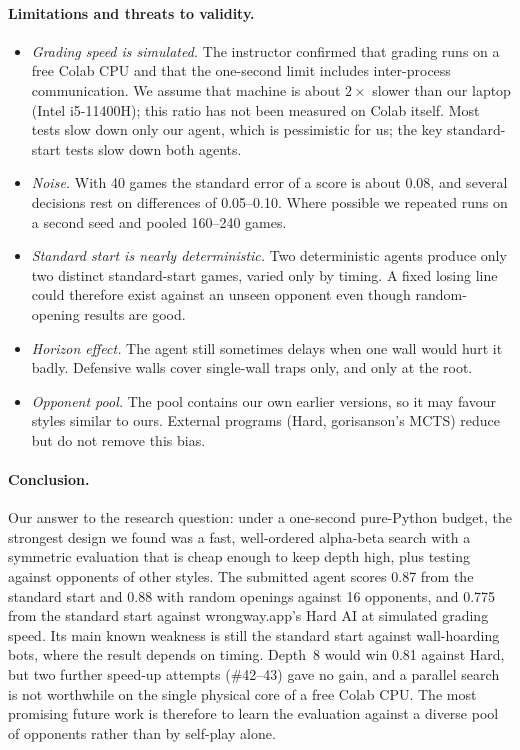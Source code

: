 \paragraph{Limitations and threats to validity.}
\begin{itemize}
  \item \emph{Grading speed is simulated.} The instructor confirmed that grading runs on a free
        Colab CPU and that the one-second limit includes inter-process communication. We assume
        that machine is about $2\times$ slower than our laptop (Intel i5-11400H); this ratio has
        not been measured on Colab itself. Most tests slow down only our agent, which is
        pessimistic for us; the key standard-start tests slow down both agents.
  \item \emph{Noise.} With 40 games the standard error of a score is about 0.08, and several
        decisions rest on differences of 0.05--0.10. Where possible we repeated runs on a second
        seed and pooled 160--240 games.
  \item \emph{Standard start is nearly deterministic.} Two deterministic agents produce only two
        distinct standard-start games, varied only by timing. A fixed losing line could
        therefore exist against an unseen opponent even though random-opening results are good.
  \item \emph{Horizon effect.} The agent still sometimes delays when one wall would hurt it
        badly. Defensive walls cover single-wall traps only, and only at the root.
  \item \emph{Opponent pool.} The pool contains our own earlier versions, so it may favour
        styles similar to ours. External programs (Hard, gorisanson's MCTS) reduce but do not
        remove this bias.
\end{itemize}

\paragraph{Conclusion.}
Our answer to the research question: under a one-second pure-Python budget, the strongest
design we found was a fast, well-ordered alpha-beta search with a symmetric evaluation that is
cheap enough to keep depth high, plus testing against opponents of other styles. The submitted
agent scores 0.87 from the standard start and 0.88 with random openings against 16 opponents,
and 0.775 from the standard start against wrongway.app's Hard AI at simulated grading speed. Its
main known weakness is still the standard start against wall-hoarding bots, where the result
depends on timing.
Depth~8 would win 0.81 against Hard, but two further speed-up attempts (\#42--43) gave no gain,
and a parallel search is not worthwhile on the single physical core of a free Colab CPU. The most
promising future work is therefore to learn the evaluation against a diverse pool of opponents
rather than by self-play alone.


